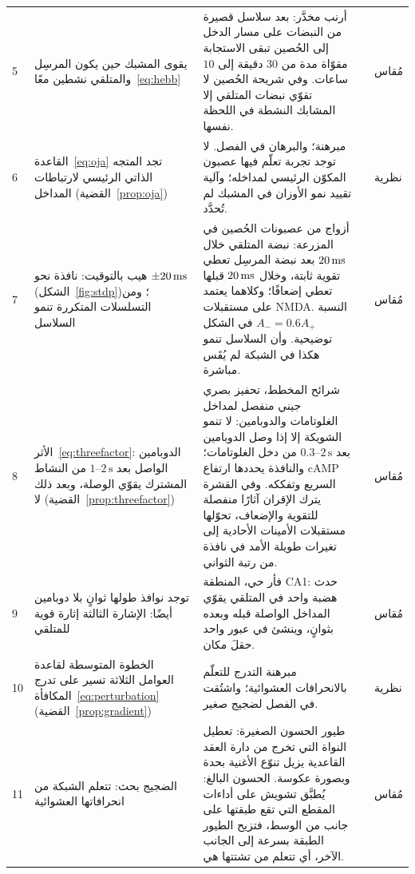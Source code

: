 {\begin{longtable}{>{\raggedright}p{0.5cm}>{\raggedright}p{4.0cm}>{\raggedright}p{5.6cm}>{\raggedright}p{2.3cm}>{\raggedright\arraybackslash}p{1.7cm}}
5 & يقوى المشبك حين يكون المرسِل والمتلقي نشطين معًا~\eqref{eq:hebb} & أرنب مخدَّر: بعد سلاسل قصيرة من النبضات على مسار الدخل إلى الحُصين تبقى الاستجابة مقوّاة مدة من $30$ دقيقة إلى $10$ ساعات. وفي شريحة الحُصين لا تقوّي نبضات المتلقي إلا المشابك النشطة في اللحظة نفسها. & \cite{Bliss1973LTP, Kelso1986hebb} & مُقاس \\
6 & القاعدة~\eqref{eq:oja} تجد المتجه الذاتي الرئيسي لارتباطات المداخل (القضية~\ref{prop:oja}) & مبرهنة؛ والبرهان في الفصل. لا توجد تجربة تعلّم فيها عصبون المكوّن الرئيسي لمداخله؛ وآلية تقييد نمو الأوزان في المشبك لم تُحدَّد. & \cite{Oja1982} & نظرية \\
7 & هيب بالتوقيت: نافذة نحو $\pm20\,\text{ms}$ (الشكل~\ref{fig:stdp})؛ ومن التسلسلات المتكررة تنمو السلاسل & أزواج من عصبونات الحُصين في المزرعة: نبضة المتلقي خلال $20\,\text{ms}$ بعد نبضة المرسِل تعطي تقوية ثابتة، وخلال $20\,\text{ms}$ قبلها تعطي إضعافًا؛ وكلاهما يعتمد على مستقبلات \foreignlanguage{english}{NMDA}. النسبة $A_-=0.6A_+$ في الشكل توضيحية. وأن السلاسل تنمو هكذا في الشبكة لم يُقَس مباشرة. & \cite{BiPoo1998} & مُقاس \\
8 & الأثر~\eqref{eq:threefactor}: الدوبامين الواصل بعد $1\text{--}2\,\text{s}$ من النشاط المشترك يقوّي الوصلة، وبعد ذلك لا (القضية~\ref{prop:threefactor}) & شرائح المخطط، تحفيز بصري جيني منفصل لمداخل الغلوتامات والدوبامين: لا تنمو الشويكة إلا إذا وصل الدوبامين بعد $0.3\text{--}2\,\text{s}$ من دخل الغلوتامات؛ والنافذة يحددها ارتفاع \foreignlanguage{english}{cAMP} السريع وتفككه. وفي القشرة يترك الإقران آثارًا منفصلة للتقوية والإضعاف، تحوّلها مستقبلات الأمينات الأحادية إلى تغيرات طويلة الأمد في نافذة من رتبة الثواني. & \cite{Yagishita2014, He2015eligibility} & مُقاس \\
9 & توجد نوافذ طولها ثوانٍ بلا دوبامين أيضًا: الإشارة الثالثة إثارة قوية للمتلقي & فأر حي، المنطقة \foreignlanguage{english}{CA1}: حدث هضبة واحد في المتلقي يقوّي المداخل الواصلة قبله وبعده بثوانٍ، وينشئ في عبور واحد حقلَ مكان. & \cite{Bittner2017} & مُقاس \\
10 & الخطوة المتوسطة لقاعدة العوامل الثلاثة تسير على تدرج المكافأة~\eqref{eq:perturbation} (القضية~\ref{prop:gradient}) & مبرهنة التدرج للتعلّم بالانحرافات العشوائية؛ واشتُقت في الفصل لضجيج صغير. & \cite{Williams1992} & نظرية \\
11 & الضجيج بحث: تتعلم الشبكة من انحرافاتها العشوائية & طيور الحسون الصغيرة: تعطيل النواة التي تخرج من دارة العقد القاعدية يزيل تنوّع الأغنية بحدة وبصورة عكوسة. الحسون البالغ: يُطبَّق تشويش على أداءات المقطع التي تقع طبقتها على جانب من الوسط، فتزيح الطيور الطبقة بسرعة إلى الجانب الآخر، أي تتعلم من تشتتها هي. & \cite{Olveczky2005, TumerBrainard2007} & مُقاس \\

\end{longtable}}
